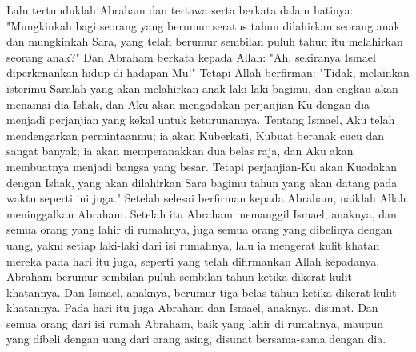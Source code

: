 \begin{biblechapter}
\verse Lalu tertunduklah Abraham dan tertawa serta berkata dalam hatinya: "Mungkinkah bagi seorang yang berumur seratus tahun dilahirkan seorang anak dan mungkinkah Sara, yang telah berumur sembilan puluh tahun itu melahirkan seorang anak?"
\verse Dan Abraham berkata kepada Allah: "Ah, sekiranya Ismael diperkenankan hidup di hadapan-Mu!"
\verse Tetapi Allah berfirman: "Tidak, melainkan isterimu Saralah yang akan melahirkan anak laki-laki bagimu, dan engkau akan menamai dia Ishak, dan Aku akan mengadakan perjanjian-Ku dengan dia menjadi perjanjian yang kekal untuk keturunannya.
\verse Tentang Ismael, Aku telah mendengarkan permintaanmu; ia akan Kuberkati, Kubuat beranak cucu dan sangat banyak; ia akan memperanakkan dua belas raja, dan Aku akan membuatnya menjadi bangsa yang besar.
\verse Tetapi perjanjian-Ku akan Kuadakan dengan Ishak, yang akan dilahirkan Sara bagimu tahun yang akan datang pada waktu seperti ini juga."
\verse Setelah selesai berfirman kepada Abraham, naiklah Allah meninggalkan Abraham.
\verse Setelah itu Abraham memanggil Ismael, anaknya, dan semua orang yang lahir di rumahnya, juga semua orang yang dibelinya dengan uang, yakni setiap laki-laki dari isi rumahnya, lalu ia mengerat kulit khatan mereka pada hari itu juga, seperti yang telah difirmankan Allah kepadanya.
\verse Abraham berumur sembilan puluh sembilan tahun ketika dikerat kulit khatannya.
\verse Dan Ismael, anaknya, berumur tiga belas tahun ketika dikerat kulit khatannya.
\verse Pada hari itu juga Abraham dan Ismael, anaknya, disunat.
\verse Dan semua orang dari isi rumah Abraham, baik yang lahir di rumahnya, maupun yang dibeli dengan uang dari orang asing, disunat bersama-sama dengan dia.
\end{biblechapter}

